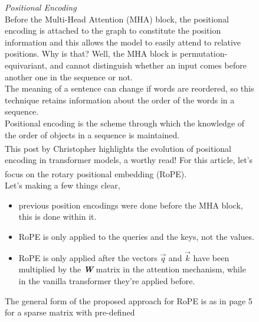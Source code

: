 \documentclass[12pt]{article}
\newcommand{\customtext}[3]{%
    \vspace{#2} %
    \fontsize{13}{8}\textcolor{#1}{\textit{#3}}%
}
\newcommand{\bandi}[1]{\textbf{\textit{#1}}}
\newcommand{\sidecite}[1]{\textsuperscript{\textcolor{blue}{\textbf{\scriptsize#1}}}}
\newcommand{\maincitecount}{\sidecite{\stepcounter{maincite}\themaincite}}
\begin{document}
\begin{figure}[!htb]
    \begin{minipage}[t]{0.65\textwidth}
    \raggedright
    \customtext{xtitle}{0em}{Positional Encoding}\\
    Before the Multi-Head Attention (MHA) block, the positional encoding is attached to the graph to constitute the position information and 
    this allows the model to easily attend to relative positions.
    Why is that? Well, the MHA block is permutation-equivariant, and cannot distinguish whether an input comes before another one in the 
    sequence or not.\\
    The meaning of a sentence can change if words are reordered, so this technique retains information about the order of the words in a sequence.\\
    Positional encoding is the scheme through which the knowledge of the order of objects in a sequence is maintained.\\
    This post by Christopher{\maincitecount} highlights the evolution of positional encoding in transformer models, a worthy read! For this article, 
    let's focus on the rotary positional embedding (RoPE){\maincitecount}.\\    
    Let's making a few things clear, 
    \begin{itemize}[left=0pt,topsep=0pt,itemsep=-1ex,parsep=0ex]
        \item previous position encodings were done before the MHA block, this is done within it.
        \item RoPE is only applied to the queries and the keys, not the values. 
        \item RoPE is only applied after the vectors $\vec{q}$ and $\vec{k}$ have been multiplied by the 
        \bandi{W} matrix in the attention mechanism, while in the vanilla transformer they're applied before.
      \end{itemize}
    \vspace{1em}
    The general form of the proposed approach for RoPE is as in page 5 for a sparse matrix with pre-defined 

\end{minipage}
\end{figure}
\end{document}

